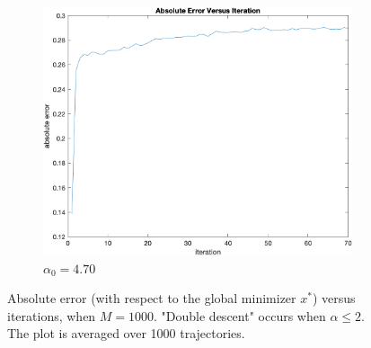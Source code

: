 \documentclass{article}
\begin{document}
\begin{figure}[htp]
\begin{subfigure}{.5\textwidth}
	\includegraphics[width=0.9\linewidth]{figs/Q3/Iteration/M1000_a470.png}
	\caption{$ \alpha_0 = 4.70 $}
\end{subfigure}
	
	\caption{Absolute error (with respect to the global minimizer $ x^{\ast} $) versus iterations, when $ M = 1000 $. "Double descent" occurs when $ \alpha \leq 2 $. The plot is averaged over 1000 trajectories.}
	\label{fig: Q3_iteration}
	
\end{figure}
\end{document}
